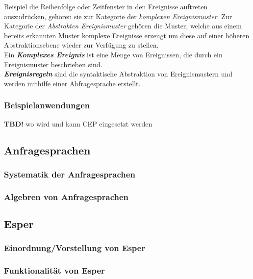\documentclass{acm_proc_article-sp}
\begin{document}
Beispiel die Reihenfolge oder Zeitfenster in den Ereignisse auftreten auszudrücken, 
gehören sie zur Kategorie der \textit{komplexen Ereignismuster}. Zur Kategorie der 
\textit{Abstrakten Ereignismuster} gehören die Muster, welche aus einem bereits erkannten 
Muster komplexe Ereignisse erzeugt um diese auf einer höheren Abstraktionsebene wieder 
zur Verfügung zu stellen.\\
Ein \textbf{\textit{Komplexes Ereignis}} ist eine Menge von Ereignissen, die durch ein 
Ereignismuster beschrieben sind.\\
\textbf{\textit{Ereignisregeln}} sind die syntaktische Abstraktion von Ereignismustern 
und werden mithilfe einer Abfragesprache erstellt.

\subsubsection{Beispielanwendungen}
\vspace{0.1cm}


\textbf{TBD!} wo wird und kann CEP eingesetzt werden\\


%
%
\subsection{Anfragesprachen}
\vspace{0.1cm}

\subsubsection{Systematik der Anfragesprachen}
\vspace{0.1cm}
\subsubsection{Algebren von Anfragesprachen}
\vspace{0.1cm}

%
%
\subsection{Esper}
\vspace{0.1cm}
\subsubsection{Einordnung/Vorstellung  von Esper}
\vspace{0.1cm}
\subsubsection{Funktionalität von Esper}
\vspace{0.1cm}
\end{document}
